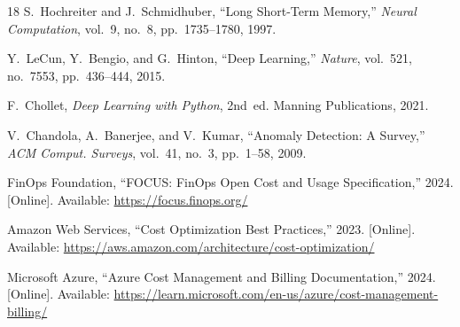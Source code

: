 \documentclass[conference]{IEEEtran}
\begin{document}
\begin{thebibliography}{18}
S.~Hochreiter and J.~Schmidhuber, ``Long Short-Term Memory,'' \textit{Neural Computation}, vol.~9, no.~8, pp.~1735--1780, 1997.

Y.~LeCun, Y.~Bengio, and G.~Hinton, ``Deep Learning,'' \textit{Nature}, vol.~521, no.~7553, pp.~436--444, 2015.

F.~Chollet, \textit{Deep Learning with Python}, 2nd~ed. Manning Publications, 2021.

V.~Chandola, A.~Banerjee, and V.~Kumar, ``Anomaly Detection: A Survey,'' \textit{ACM Comput. Surveys}, vol.~41, no.~3, pp.~1--58, 2009.

FinOps Foundation, ``FOCUS: FinOps Open Cost and Usage Specification,'' 2024. [Online]. Available: \url{https://focus.finops.org/}

Amazon Web Services, ``Cost Optimization Best Practices,'' 2023. [Online]. Available: \url{https://aws.amazon.com/architecture/cost-optimization/}

Microsoft Azure, ``Azure Cost Management and Billing Documentation,'' 2024. [Online]. Available: \url{https://learn.microsoft.com/en-us/azure/cost-management-billing/}

\end{thebibliography}
\end{document}
